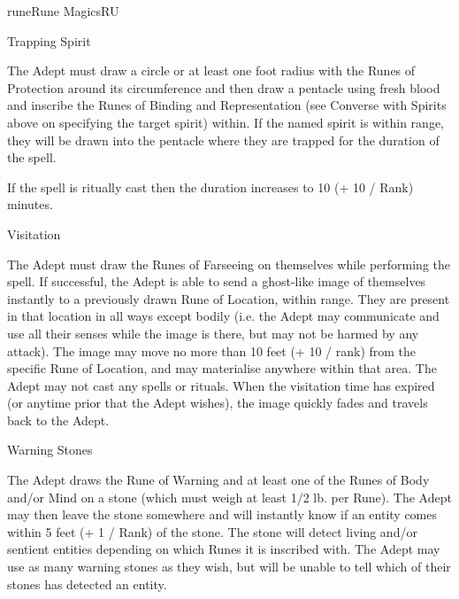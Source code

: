 \begin{College}[2.2]{rune}{Rune Magics}{RU}
\begin{spell}[S-15]{Trapping Spirit}

\begin{effects}
The Adept must draw a circle or at least one foot radius with the
Runes of Protection around its circumference and then draw a pentacle
using fresh blood and inscribe the Runes of Binding and Representation
(see Converse with Spirits above on specifying the target spirit)
within. If the named spirit is within range, they will be drawn into
the pentacle where they are trapped for the duration of the spell.

If the spell is ritually cast then the duration increases to 10 (+ 10
/ Rank) minutes.
\end{effects}
\end{spell}

\begin{spell}[S-16]{Visitation}

\begin{effects}
The Adept must draw the Runes of Farseeing on themselves while
performing the spell.  If successful, the Adept is able to send a
ghost-like image of themselves instantly to a previously drawn Rune of
Location, within range.  They are present in that location in all ways
except bodily (i.e. the Adept may communicate and use all their senses
while the image is there, but may not be harmed by any attack).  The
image may move no more than 10 feet (+ 10 / rank) from the specific
Rune of Location, and may materialise anywhere within that area.  The
Adept may not cast any spells or rituals. When the visitation time has
expired (or anytime prior that the Adept wishes), the image quickly
fades and travels back to the Adept.
\end{effects}
\end{spell}

\begin{spell}[S-17]{Warning Stones}

\begin{effects}
The Adept draws the Rune of Warning and at least one of the Runes of
Body and/or Mind on a stone (which must weigh at least 1/2 lb. per
Rune).  The Adept may then leave the stone somewhere and will
instantly know if an entity comes within 5 feet (+ 1 / Rank) of the
stone. The stone will detect living and/or sentient entities depending
on which Runes it is inscribed with.  The Adept may use as many
warning stones as they wish, but will be unable to tell which of their
stones has detected an entity.
\end{effects}
\end{spell}


\end{College}
